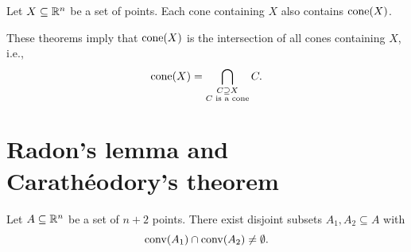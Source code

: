 \begin{theorem}
  \label{conv:thr:9}
  Let $X\subseteq\mathbb{R}^n$ be a set of points. Each cone containing $X$ also
  contains $\mathrm{cone}(X)$. 
\end{theorem}

These theorems imply that $\mathrm{cone}(X)$ is the intersection of all
cones  containing $X$, i.e., 
\begin{displaymath}
  \mathrm{cone}(X) = \bigcap_{\substack{C \supseteq X\\ C \text{  is a cone}}} C. 
\end{displaymath}


\section{Radon's lemma and Carath\'eodory's theorem}
\label{conv:sec:radons-lemma-carath}

\begin{theorem}
  \label{conv:thr:6}
  Let $A\subseteq\mathbb{R}^n$ be  a set of $n+2$ points. There exist disjoint
  subsets $A_1,A_2\subseteq A$ with
  \begin{displaymath}
    \operatorname{conv}(A_1) \cap \operatorname{conv}(A_2) \neq \emptyset.
  \end{displaymath}
\end{theorem}

